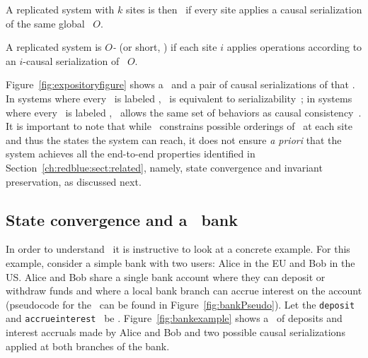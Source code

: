 A replicated system with
$k$ sites is then \RBct\ if every site applies a causal serialization
of the same global \RBo\ $O$.

\begin{mydef}[\RBc]
A replicated system is {\em $O$-\RBct} (or short, \RBct) if each site $i$ applies
operations according to an $i$-causal serialization of \RBo\ $O$.
\label{def:rbct}
\end{mydef}

Figure~\ref{fig:expositoryfigure} shows a \RBo\ and a pair of causal
serializations of that \RBo. In systems where every \operation\ is
labeled \red, \RBc\ is equivalent to
serializability~\cite{Bernstein1987CCR}; in systems where every
\operation\ is labeled \blue, \RBc\ allows the same set of behaviors as
causal consistency~\cite{Terry1995Managing,Lloyd2011Causal,
Mahajan2010Depot}. It is important to note that while \RBc\ constrains 
possible orderings of \operations\ at each site and thus the states the
system can reach, it does not ensure {\em a priori} that the system achieves 
all the end-to-end properties identified in Section~\ref{ch:redblue:sect:related}, 
namely, state convergence and invariant preservation, as discussed next.

\subsection{State convergence and a \RB\ bank}
\label{ch:redblue:sect:diverge}

In order to understand \RBc\ it is instructive to look at a concrete example. 
For this example, consider a simple bank with two users: Alice in the EU and Bob in the
US. Alice and Bob share a single bank account where they can deposit
or withdraw funds and where a local bank branch can accrue interest on
the account (pseudocode for the \operations\ can be found in
Figure~\ref{fig:bankPseudo}).  
Let the {\tt deposit} and {\tt accrueinterest} \operations\ be \blue.
Figure~\ref{fig:bankexample} shows a \RBo\ of deposits and interest
accruals made by Alice and Bob and two possible causal serializations applied at
both branches of the bank.

